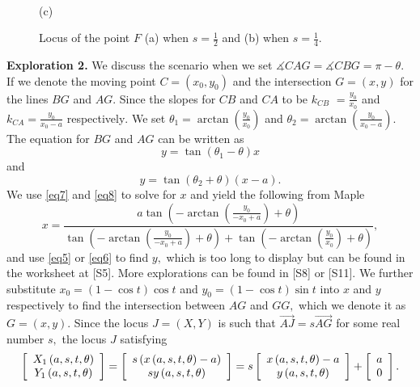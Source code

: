 \documentclass[12pt,a4paper]{article}%
\begin{document}
\begin{figure}[htpb]
\begin{center}
{\begin{center}
 \\ (c)
\end{center}}
\end{center}
\caption{Locus of the point $F$ (a) when $s=\frac{1}{2}$ and (b) when $s=\frac{1}{4}$.}
\label{fig14}
\end{figure}

\textbf{Exploration 2. }We discuss the scenario when we set $\measuredangle
CAG=\measuredangle CBG=\pi-\theta.$ If we denote the moving point $C=\left(
x_{0},y_{0}\right)  $ and the intersection $G=\left(  x,y\right)  $ for the
lines $BG$ and $AG.$ Since the slopes for $CB$ and $CA$ to be $k_{CB} $
$=\frac{y_{0}}{x_{0}}$ and $k_{CA}=\frac{y_{0}}{x_{0}-a}$ respectively$.$ We
set $\theta_{1}=\arctan\left(  \frac{y_{0}}{x_{0}}\right)  $ and $\theta
_{2}=\arctan\left(  \frac{y_{0}}{x_{0}-a}\right)  .$ The equation for $BG$ and
$AG$ can be written as
\begin{equation}
y=\tan\left(  \theta_{1}-\theta\right)  x\label{eq7}%
\end{equation}
and%
\begin{equation}
y=\tan\left(  \theta_{2}+\theta\right)  \left(  x-a\right)  .\label{eq8}%
\end{equation}
We use \ref{eq7} and \ref{eq8} to solve for $x$ and yield the following from
Maple \cite{Maple}
\[
x=\frac{a\tan\left(  -\arctan\left(  \frac{y_{0}}{-x_{0}+a}\right)
+\theta\right)  }{\tan\left(  -\arctan\left(  \frac{y_{0}}{-x_{0}+a}\right)
+\theta\right)  +\tan\left(  -\arctan\left(  \frac{y_{0}}{x_{0}}\right)
+\theta\right)  },
\]
and use \ref{eq5} or \ref{eq6} to find $y,$ which is too long to display but
can be found in the worksheet at [S5]. More explorations can be found in [S8]
or [S11]. We further substitute $x_{0}=\left(  1-\cos t\right)  \cos t$ and
$y_{0}=\left(  1-\cos t\right)  \sin t$ into $x$ and $y$ respectively to find
the intersection between $AG$ and $GG,$ which we denote it as $G=(x,y)$. Since
the locus $J=(X,Y)$ is such that $\overrightarrow{AJ}=s\overrightarrow{AG}$
for some real number $s,$ the locus $J$ satisfying
\[
\left[
\begin{array}
[c]{c}%
X_{1}\left(  a,s,t,\theta\right) \\
Y_{1}\left(  a,s,t,\theta\right)
\end{array}
\right]  =\left[
\begin{array}
[c]{c}%
s\left(  x\left(  a,s,t,\theta\right)  -a\right) \\
sy\left(  a,s,t,\theta\right)
\end{array}
\right]  =s\left[
\begin{array}
[c]{c}%
x\left(  a,s,t,\theta\right)  -a\\
y\left(  a,s,t,\theta\right)
\end{array}
\right]  +\left[
\begin{array}
[c]{c}%
a\\
0
\end{array}
\right]  .
\]
\end{document}

